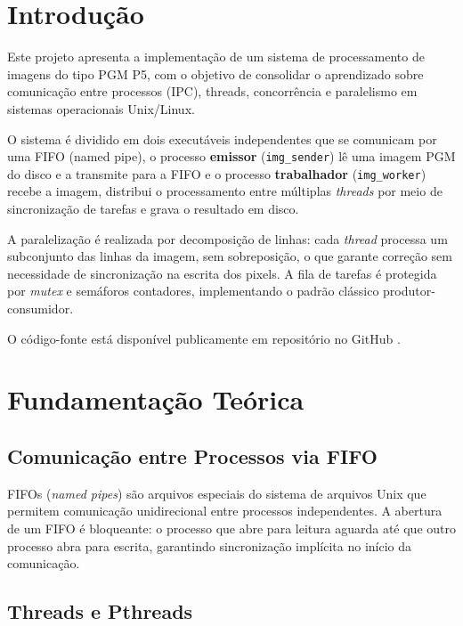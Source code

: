 \documentclass[12 pt]{abntex2}
\begin{document}
\imprimirfolhaderosto

\tableofcontents*
\clearpage

\section{Introdução}

Este projeto apresenta a implementação de um sistema de processamento de
imagens do tipo PGM P5, com o objetivo de consolidar o aprendizado sobre
comunicação entre processos (IPC), threads, concorrência e
paralelismo em sistemas operacionais Unix/Linux.
 
O sistema é dividido em dois executáveis independentes que se comunicam por
uma FIFO (named pipe), o processo \textbf{emissor} (\texttt{img\_sender}) lê uma
imagem PGM do disco e a transmite para a FIFO e o processo \textbf{trabalhador}
(\texttt{img\_worker}) recebe a imagem, distribui o processamento entre
múltiplas \textit{threads} por meio de sincronização de tarefas e grava o resultado em disco.
 
A paralelização é realizada por decomposição de linhas: cada \textit{thread}
processa um subconjunto das linhas da imagem, sem sobreposição, o que garante
correção sem necessidade de sincronização na escrita dos pixels. A fila de
tarefas é protegida por \textit{mutex} e semáforos contadores, implementando
o padrão clássico produtor-consumidor.

O código-fonte está disponível publicamente em repositório no GitHub \cite{https://github.com/lutsc/so-av1/}.

\section{Fundamentação Teórica}
 
\subsection{Comunicação entre Processos via FIFO}
 
FIFOs (\textit{named pipes}) são arquivos especiais do sistema de arquivos
Unix que permitem comunicação unidirecional entre processos independentes. A
abertura de um FIFO é bloqueante: o processo que abre para leitura aguarda
até que outro processo abra para escrita, garantindo sincronização implícita
no início da comunicação.
 
\subsection{Threads e Pthreads}
 
\end{document}
